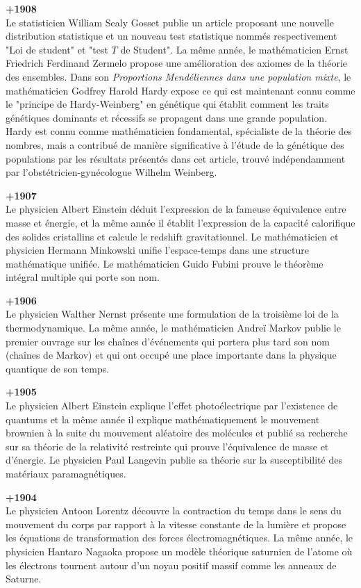 \textbf{+1908}\\
Le statisticien William Sealy Gosset publie un article proposant une nouvelle distribution statistique et un nouveau test statistique nommés respectivement "Loi de student" et "test $T$ de Student". La même année, le mathématicien Ernst Friedrich Ferdinand Zermelo propose une amélioration des axiomes de la théorie des ensembles. Dans son \textit{Proportions Mendéliennes dans une population mixte}, le mathématicien Godfrey Harold Hardy expose ce qui est maintenant connu comme le "principe de Hardy-Weinberg" en génétique qui établit comment les traits génétiques dominants et récessifs se propagent dans une grande population. Hardy est connu comme mathématicien fondamental, spécialiste de la théorie des nombres, mais a contribué de manière significative à l'étude de la génétique des populations par les résultats présentés dans cet article, trouvé indépendamment par l'obstétricien-gynécologue Wilhelm Weinberg.

\textbf{+1907}\\
Le physicien Albert Einstein déduit l'expression de la fameuse équivalence entre masse et énergie, et la même année il établit l'expression de la capacité calorifique des solides cristallins et calcule le redshift gravitationnel. Le mathématicien et physicien Hermann Minkowski unifie l'espace-temps dans une structure mathématique unifiée. Le mathématicien Guido Fubini prouve le théorème intégral multiple qui porte son nom.

\textbf{+1906}\\
Le physicien Walther Nernst présente une formulation de la troisième loi de la thermodynamique. La même année, le mathématicien Andreï Markov publie le premier ouvrage sur les chaînes d'événements qui portera plus tard son nom (chaînes de Markov) et qui ont occupé une place importante dans la physique quantique de son temps.

\textbf{+1905}\\
Le physicien Albert Einstein explique l'effet photoélectrique par l'existence de quantums et la même année il explique mathématiquement le mouvement brownien à la suite du mouvement aléatoire des molécules et publié sa recherche sur sa théorie de la relativité restreinte qui prouve l'équivalence de masse et d'énergie. Le physicien Paul Langevin publie sa théorie sur la susceptibilité des matériaux paramagnétiques.

\textbf{+1904}\\
Le physicien Antoon Lorentz découvre la contraction du temps dans le sens du mouvement du corps par rapport à la vitesse constante de la lumière et propose les équations de transformation des forces électromagnétiques. La même année, le physicien Hantaro Nagaoka propose un modèle théorique saturnien de l'atome où les électrons tournent autour d'un noyau positif massif comme les anneaux de Saturne.

